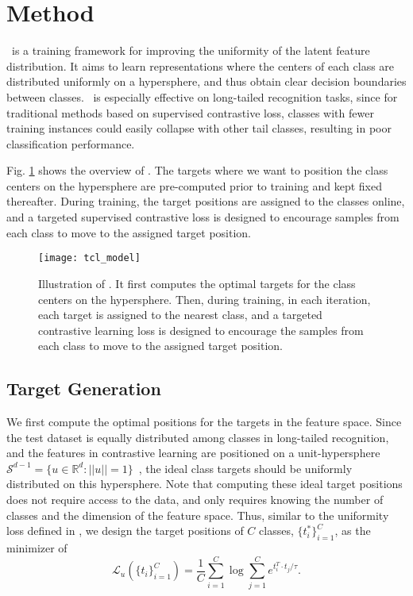 \section{Method}

\name~is a training framework for improving the uniformity of the latent feature distribution. It aims to learn representations where the centers of each class are distributed uniformly on a hypersphere, and thus obtain clear decision boundaries between classes. \name~is especially effective on long-tailed recognition tasks, since for traditional methods based on supervised contrastive loss, classes with fewer training instances could easily collapse with other tail classes, resulting in poor classification performance.

Fig. \ref{fig:model} shows the overview of \name. The targets where we want to position the class centers on the hypersphere are pre-computed prior to training and kept fixed thereafter. During training, the target positions are assigned to the classes online, and a targeted supervised contrastive loss is designed to encourage samples from each class to move to the assigned target position.

\begin{figure}[t]
\begin{center}

\texttt{[image: tcl\_model]}
\end{center}
\vspace{-10pt}
\caption{\small Illustration of \name. It first computes the optimal targets for the class centers on the hypersphere. Then, during training, in each iteration, each target is assigned to the nearest class, and a targeted contrastive learning loss is designed to encourage the samples from each class to move to the assigned target position. }
\label{fig:model}
\vspace{-10pt}
\end{figure}

\subsection{Target Generation}

We first compute the optimal positions for the targets in the feature space. Since the test dataset is equally distributed among classes in long-tailed recognition, and the features in contrastive learning are positioned on a unit-hypersphere $\mathcal{S}^{d-1} = \{u \in \mathbb{R}^d: ||u|| = 1\}$~\cite{chen2020simple,he2020momentum}, 
the ideal class targets should be uniformly distributed on this hypersphere. 
Note that computing these ideal target positions does not require access to the data, and only requires knowing the number of classes and the dimension of the feature space. 
Thus, similar to the uniformity loss defined in \cite{wang2020understanding}, we design the target positions of $C$ classes, $\{t^*_i\}_{i=1}^C$, as the minimizer of 
\begin{equation}
    \mathcal{L}_{u}(\{t_i\}_{i=1}^C) = \frac{1}{C}\sum\limits_{i=1}^C \log \sum\limits_{j=1}^C e^{t_i^T\cdot t_j/\tau}.
\end{equation}

